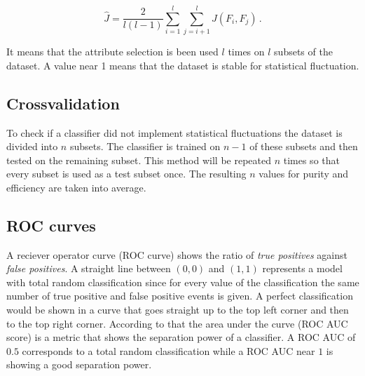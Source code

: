 \begin{equation*}
    \hat{J} = \frac{2}{l \left(l - 1 \right)} \sum\limits_{i = 1}^{l}\sum\limits_{j = i+1}^{l} J\left(F_i, F_j \right) \, .
\end{equation*}

It means that the attribute selection is been used $l$ times on $l$ subsets of the dataset.
A value near 1 means that the dataset is stable for statistical fluctuation.

\subsection{Crossvalidation}
To check if a classifier did not implement statistical fluctuations the dataset is divided into $n$ subsets.
The classifier is trained on $n-1$ of these subsets and then tested on the remaining subset.
This method will be repeated $n$ times so that every subset is used as a test subset once.
The resulting $n$ values for purity and efficiency are taken into average.

\subsection{ROC curves}
A reciever operator curve (ROC curve) shows the ratio of \textit{true positives} against \textit{false positives}.
A straight line between $\left(0,0 \right)$ and $\left(1,1 \right)$ represents a model with total random classification since for every value of the classification the same number of true positive and false positive events is given.
A perfect classification would be shown in a curve that goes straight up to the top left corner and then to the top right corner.
According to that the area under the curve (ROC AUC score) is a metric that shows the separation power of a classifier.
A ROC AUC of $0.5$ corresponds to a total random classification while a ROC AUC near $1$ is showing a good separation power.
